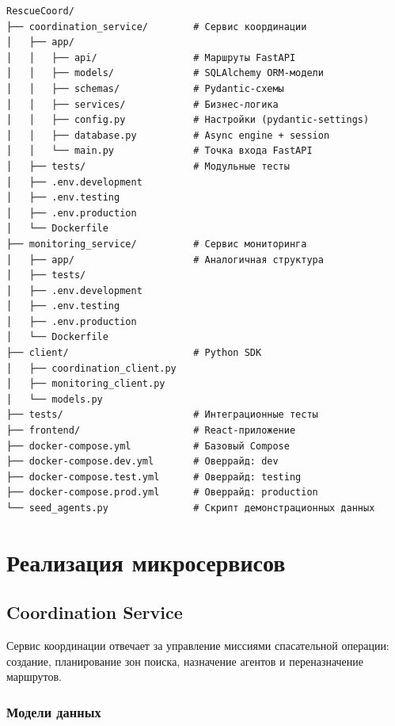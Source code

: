 \documentclass[12pt,a4paper]{article}
\begin{document}
\begin{lstlisting}[style=bash, caption={Структура директорий проекта}]
RescueCoord/
├── coordination_service/        # Сервис координации
│   ├── app/
│   │   ├── api/                 # Маршруты FastAPI
│   │   ├── models/              # SQLAlchemy ORM-модели
│   │   ├── schemas/             # Pydantic-схемы
│   │   ├── services/            # Бизнес-логика
│   │   ├── config.py            # Настройки (pydantic-settings)
│   │   ├── database.py          # Async engine + session
│   │   └── main.py              # Точка входа FastAPI
│   ├── tests/                   # Модульные тесты
│   ├── .env.development
│   ├── .env.testing
│   ├── .env.production
│   └── Dockerfile
├── monitoring_service/          # Сервис мониторинга
│   ├── app/                     # Аналогичная структура
│   ├── tests/
│   ├── .env.development
│   ├── .env.testing
│   ├── .env.production
│   └── Dockerfile
├── client/                      # Python SDK
│   ├── coordination_client.py
│   ├── monitoring_client.py
│   └── models.py
├── tests/                       # Интеграционные тесты
├── frontend/                    # React-приложение
├── docker-compose.yml           # Базовый Compose
├── docker-compose.dev.yml       # Оверрайд: dev
├── docker-compose.test.yml      # Оверрайд: testing
├── docker-compose.prod.yml      # Оверрайд: production
└── seed_agents.py               # Скрипт демонстрационных данных
\end{lstlisting}

\section{Реализация микросервисов}

\subsection{Coordination Service}

Сервис координации отвечает за управление миссиями спасательной операции:
создание, планирование зон поиска, назначение агентов и переназначение маршрутов.

\subsubsection{Модели данных}
\end{document}
